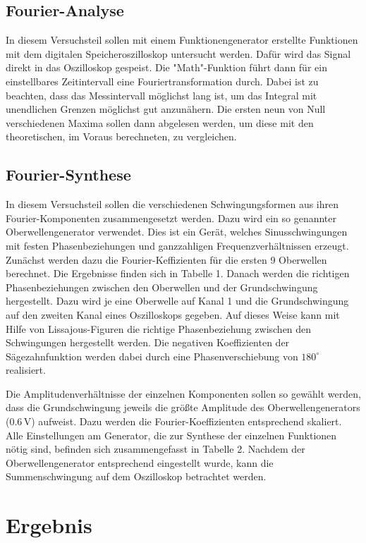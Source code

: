 \documentclass[11pt,ngerman,a4paper]{article}
\begin{document}
\subsection{Fourier-Analyse}
In diesem Versuchsteil sollen mit einem Funktionengenerator erstellte Funktionen mit dem digitalen Speicheroszilloskop untersucht werden. Dafür wird das Signal direkt in das Oszilloskop gespeist. Die "Math"-Funktion führt dann für ein einstellbares Zeitintervall eine Fouriertransformation durch. Dabei ist zu beachten, dass das Messintervall möglichst lang ist, um das Integral mit unendlichen Grenzen möglichst gut anzunähern. Die ersten neun von Null verschiedenen Maxima sollen dann abgelesen werden, um diese mit den theoretischen, im Voraus berechneten, zu vergleichen.
\subsection{Fourier-Synthese}

In diesem Versuchsteil sollen die verschiedenen Schwingungsformen aus ihren Fourier-Komponenten zusammengesetzt werden. Dazu wird ein so genannter Oberwellengenerator verwendet. Dies ist ein Ger\"at, welches Sinusschwingungen mit festen Phasenbeziehungen und ganzzahligen Frequenzverh\"altnissen erzeugt. Zun\"achst werden dazu die Fourier-Keffizienten f\"ur die ersten 9 Oberwellen berechnet. Die Ergebnisse finden sich in Tabelle 1. Danach werden die richtigen Phasenbeziehungen zwischen den Oberwellen und der Grundschwingung hergestellt. Dazu wird je eine Oberwelle auf Kanal 1 und die Grundschwingung auf den zweiten Kanal eines Oszilloskops gegeben. Auf dieses Weise kann mit Hilfe von Lissajous-Figuren die richtige Phasenbeziehung zwischen den Schwingungen hergestellt werden. Die negativen Koeffizienten der S\"agezahnfunktion werden dabei durch eine Phasenverschiebung von $180 ^\circ$ realisiert. 

\noindent
Die Amplitudenverh\"altnisse der einzelnen Komponenten sollen so gew\"ahlt werden, dass die Grundschwingung jeweils die gr\"o\ss te Amplitude des Oberwellengenerators ($0.6\,$V) aufweist. Dazu werden die Fourier-Koeffizienten entsprechend skaliert. Alle Einstellungen am Generator, die zur Synthese der einzelnen Funktionen n\"otig sind, befinden sich zusammengefasst in Tabelle 2. Nachdem der Oberwellengenerator entsprechend eingestellt wurde, kann die Summenschwingung auf dem Oszilloskop betrachtet werden.
\section{Ergebnis}
\end{document}
